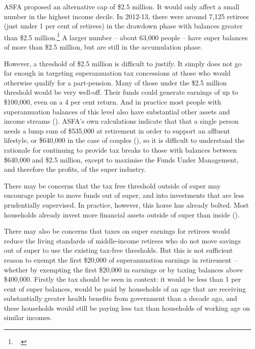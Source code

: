 ASFA proposed an alternative cap of \$2.5 million. It would only affect a small number in the highest income decile. In 2012-13, there were around 7,125 retirees (just under 1 per cent of retirees) in the drawdown phase with balances greater than \$2.5 million.\footnote{\gao\ \textcite{ABS2013t}.}   A larger number – about 63,000 people – have super balances of more than \$2.5 million, but are still in the accumulation phase.

However, a threshold of \$2.5 million is difficult to justify. It simply does not go far enough in targeting superannuation tax concessions at those who would otherwise qualify for a part-pension. Many of those under the \$2.5 million threshold would be very well-off. Their funds could generate earnings of up to \$100,000, even on a 4 per cent return. And in practice most people with superannuation balances of this level also have substantial other assets and income streams (). ASFA’s own calculations indicate that that a single person needs a lump sum of \$535,000 at retirement in order to support an affluent lifestyle, or \$640,000 in the case of couples (), so it is difficult to understand the rationale for continuing to provide tax breaks to those with balances between \$640,000 and \$2.5 million, except to maximise the Funds Under Management, and therefore the profits, of the super industry. 

There may be concerns that the tax free threshold outside of super may encourage people to move funds out of super, and into investments that are less prudentially supervised. In practice, however, this horse has already bolted. Most households already invest more financial assets outside of super than inside ().

There may also be concerns that taxes on super earnings for retirees would reduce the living standards of middle-income retirees who do not move savings out of super to use the existing tax-free thresholds. But this is not sufficient reason to exempt the first \$20,000 of superannuation earnings in retirement – whether by exempting the first \$20,000 in earnings or by taxing balances above \$400,000. Firstly the tax should be seen in context: it would be less than 1 per cent of super balances, would be paid by households of an age that are receiving substantially greater health benefits from government than a decade ago, and these households would still be paying less tax than households of working age on similar incomes. 

